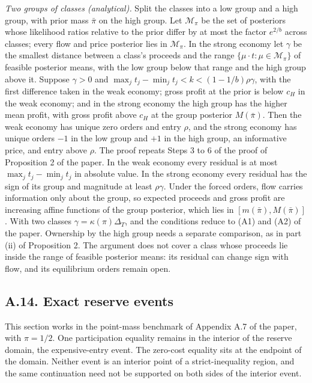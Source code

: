 \documentclass[
  11pt,
]{article}
\begin{document}
\emph{Two groups of classes (analytical).} Split the classes into a low
group and a high group, with prior mass \(\bar\pi\) on the high group.
Let \(\mathcal M_\pi\) be the set of posteriors whose likelihood ratios
relative to the prior differ by at most the factor \(e^{2/b}\) across
classes; every flow and price posterior lies in \(\mathcal M_\pi\). In
the strong economy let \(\gamma\) be the smallest distance between a
class's proceeds and the range \(\{\mu\cdot t:\mu\in\mathcal M_\pi\}\)
of feasible posterior means, with the low group below that range and
the high group above it. Suppose \(\gamma>0\) and
\(\max_jt_j-\min_jt_j<k<(1-1/b)\rho\gamma\), with the first difference
taken in the weak economy; gross profit at the prior is below \(c_H\) in
the weak economy; and in the strong economy the high group has the
higher mean profit, with gross profit above \(c_H\) at the group
posterior \(M(\bar\pi)\). Then the weak economy has unique zero orders
and entry \(\rho\), and the strong economy has unique orders \(-1\) in
the low group and \(+1\) in the high group, an informative price, and
entry above \(\rho\). The proof repeats Steps 3 to 6 of the proof of
Proposition 2 of the paper. In the weak economy
every residual is at most \(\max_jt_j-\min_jt_j\) in absolute value. In
the strong economy every residual has the sign of its group and
magnitude at least \(\rho\gamma\). Under the forced orders, flow
carries information only about the group, so expected proceeds and
gross profit are increasing affine functions of the group posterior,
which lies in \([m(\bar\pi),M(\bar\pi)]\). With two classes
\(\gamma=\kappa(\pi)\Delta_T\), and the conditions reduce to
(A1) and (A2) of the paper. Ownership by the high group
needs a separate comparison, as in part (ii) of Proposition 2. The
argument does not cover a class whose proceeds lie inside the range of
feasible posterior means: its residual can change sign with flow, and
its equilibrium orders remain open.

\subsection{A.14. Exact reserve events}\label{oa-a-reserve-events}

This section works in the point-mass benchmark of Appendix A.7 of the paper,
with \(\pi=1/2\). One participation equality remains in the interior of the reserve domain, the
expensive-entry event. The zero-cost equality sits at the endpoint of the
domain. Neither event is an interior point of a strict-inequality region, and
the same continuation need not be supported on both sides of the interior event.
\end{document}
